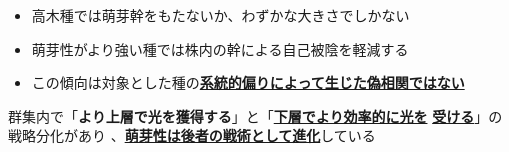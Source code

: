 \documentclass[a0, 30pt, plainboxedsections, draft]{sciposter} %
\renewcommand{\baselinestretch}{1.2}
\begin{document}
\begin{multicols}{2}
\begin{mdframed}[style=conclusion.frame,frametitle={\textbf{\Large{\faFlagAlt \vspace{0.02em} 結論: {萌芽性は樹高と背反的に進化しており、\\\hspace*{2.8em}群集の中に多様な萌芽性をもつ種が存在する}}}}]
{  \begin{itemize}
    \item 高木種では萌芽幹をもたないか、わずかな大きさでしかない
    \item 萌芽性がより強い種では株内の幹による自己被陰を軽減する
    \item この傾向は対象とした種の\textbf{\underline{系統的偏りによって生じた偽相関ではない}}
\end{itemize}
  }
  
  \faHandLeft 群集内で「\textbf{より上層で光を獲得する}」と「\textbf{\underline{下層でより効率的に光を}} \textbf{\underline{受ける}}」の戦略分化があり
  、\textbf{\underline{萌芽性は後者の戦術として進化}}している
 
\end{mdframed}

\end{multicols}
\begin{mdframed}[style=section.frame]
  \centering\LARGE\textbf{\color{white}{方法}}
\end{mdframed}\vspace{-1.2em}
\end{document}
